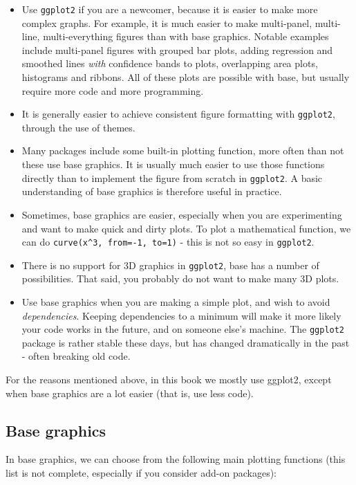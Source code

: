 \documentclass[]{book}
\providecommand{\tightlist}{%
  \setlength{\itemsep}{0pt}\setlength{\parskip}{0pt}}
\begin{document}
\begin{itemize}
\tightlist
\item
  Use \texttt{ggplot2} if you are a newcomer, because it is easier to make more complex graphs. For example, it is much easier to make multi-panel, multi-line, multi-everything figures than with base graphics. Notable examples include multi-panel figures with grouped bar plots, adding regression and smoothed lines \emph{with} confidence bands to plots, overlapping area plots, histograms and ribbons. All of these plots are possible with base, but usually require more code and more programming.
\item
  It is generally easier to achieve consistent figure formatting with \texttt{ggplot2}, through the use of themes.
\item
  Many packages include some built-in plotting function, more often than not these use base graphics. It is usually much easier to use those functions directly than to implement the figure from scratch in \texttt{ggplot2}. A basic understanding of base graphics is therefore useful in practice.
\item
  Sometimes, base graphics are easier, especially when you are experimenting and want to make quick and dirty plots. To plot a mathematical function, we can do \texttt{curve(x\^{}3,\ from=-1,\ to=1)} - this is not so easy in \texttt{ggplot2}.
\item
  There is no support for 3D graphics in \texttt{ggplot2}, base has a number of possibilities. That said, you probably do not want to make many 3D plots.
\item
  Use base graphics when you are making a simple plot, and wish to avoid \emph{dependencies}. Keeping dependencies to a minimum will make it more likely your code works in the future, and on someone else's machine. The \texttt{ggplot2} package is rather stable these days, but has changed dramatically in the past - often breaking old code.
\end{itemize}

For the reasons mentioned above, in this book we mostly use ggplot2, except when base graphics are a lot easier (that is, use less code).

\hypertarget{base-graphics}{%
\subsection{Base graphics}\label{base-graphics}}

In base graphics, we can choose from the following main plotting functions (this list is not complete, especially if you consider add-on packages):
\end{document}
